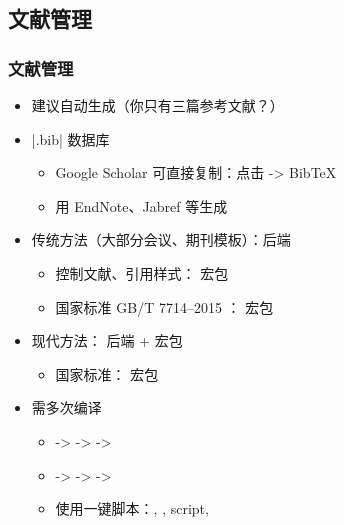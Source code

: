   \subsection{文献管理}
  \begin{frame}[fragile]
    \frametitle{文献管理}
    \begin{itemize}
      \item 建议自动生成\pause （你只有三篇参考文献？）\pause
      \item |.bib| 数据库
    
        \begin{itemize}
          \item Google Scholar 可直接复制：点击 \faQuoteRight \quad -> BibTeX
          \item 用 EndNote、Jabref 等生成
        \end{itemize} \pause
    
      \item 传统方法（大部分会议、期刊模板）：\BibTeX  后端
    
        \begin{itemize}
          \item 控制文献、引用样式： 宏包
          \item 国家标准 GB/T 7714--2015
                ：
                \alert{ 宏包}
        \end{itemize} \pause
    
      \item 现代方法： 后端 +  宏包
    
        \begin{itemize}
          \item 国家标准： 宏包
        \end{itemize} \pause
    
      \item 需多次编译
        \begin{itemize}
          \item \pdfLaTeX -> \BibTeX -> \pdfLaTeX -> \pdfLaTeX
          \item \XeLaTeX -> \BibTeX -> \XeLaTeX -> \XeLaTeX
          \item 使用一键脚本：, ,  script, 
        \end{itemize}
      
    \end{itemize}
\end{frame}

